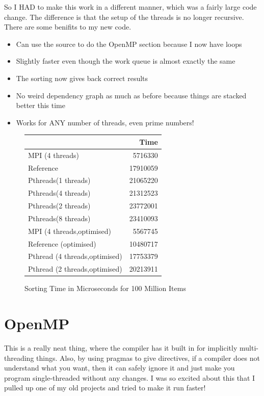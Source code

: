\documentclass[12pt]{article}
\begin{document}
So I HAD to make this work in a different manner, which was a fairly large code change.
The difference is that the setup of the threads is no longer recursive.
There are some benifits to my new code.

\begin{itemize}
	\item Can use the source to do the OpenMP section because I now have loops
	\item Slightly faster even though the work queue is almost exactly the same
	\item The sorting now gives back correct results
	\item No weird dependency graph as much as before because things are stacked better this time
	\item Works for ANY number of threads, even prime numbers!
\end{itemize}

\begin{figure} [ht]
	\centering
	\begin{tabular}{|l|r|}
		\hline
		& Time  \\ \hline
		MPI (4 threads)&5716330      \\ \hline
		Reference&17910059           \\ \hline
		Pthreads(1 threads)&21065220 \\ \hline
		Pthreads(4 threads)&21312523 \\ \hline
		Pthreads(2 threads)&23772001 \\ \hline
		Pthreads(8 threads)&23410093 \\ \hline
		\hline
		MPI (4 threads,optimised)&5567745 \\ \hline
		Reference (optimised)&10480717\\ \hline
		Pthread (4 threads,optimised)&17753379 \\ \hline
		Pthread (2 threads,optimised)&20213911 \\ \hline
	\end{tabular}
	\caption{Sorting Time in Microseconds for 100 Million Items}
	\label{sorting_time2a}
\end{figure}

\section{OpenMP}

This is a really neat thing, where the compiler has it built in for implicitly multi-threading things.
Also, by using pragmas to give directives, if a compiler does not understand what you want, then it can safely ignore it and just make you program single-threaded without any changes.
I was so excited about this that I pulled up one of my old projects and tried to make it run faster!
\end{document}
